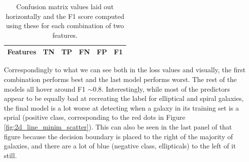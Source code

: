 \begin{table}[h]
    \centering
    \begin{tabular}{|l|c|c|c|c|c|}
    \hline
    Features & TN & TP & FN & FP & F1 \\
    \hline
    
    \end{tabular}
    \caption{Confusion matrix values laid out horizontally and the F1 score computed using these for each combination of two features.}
    \label{tab:f1_scores}
\end{table}

Correspondingly to what we can see both in the loss values and visually, the first combination performs best and the last model performs worst. The rest of the models all hover around F1 $\sim 0.8$. Interestingly, while most of the predictors appear to be equally bad at recreating the label for elliptical and spiral galaxies, the final model is a lot worse at detecting when a galaxy in its training set is a sprial (positive class, corresponding to the red dots in Figure \ref{fig:2d_line_minim_scatter}). This can also be seen in the last panel of that figure because the decision boundary is placed to the right of the majority of galaxies, and there are a lot of blue (negative class, ellipticals) to the left of it still.



